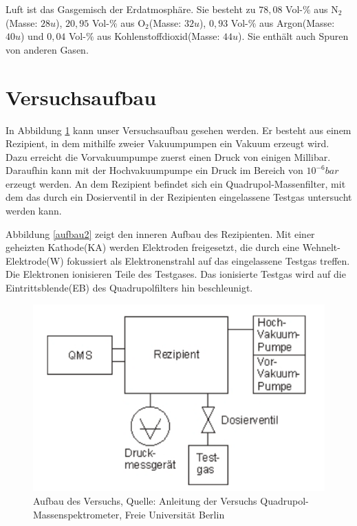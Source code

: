 \documentclass[10pt,a4paper]{article}
\begin{document}
Luft ist das Gasgemisch der Erdatmosphäre. Sie besteht zu $78,08$ Vol-$\%$ aus N$_2$(Masse: $28 u$), $20,95$ Vol-$\%$ aus O$_2$(Masse: $32u$), $0,93$ Vol-$\%$ aus Argon(Masse: $40u$) und $0,04$ Vol-$\%$ aus Kohlenstoffdioxid(Masse: $44u$). Sie enthält auch Spuren von anderen Gasen.



\section{Versuchsaufbau}

In Abbildung \ref{aufbau1} kann unser Versuchsaufbau gesehen werden. Er besteht aus einem Rezipient, in dem mithilfe zweier Vakuumpumpen ein Vakuum erzeugt wird. Dazu erreicht die Vorvakuumpumpe zuerst einen Druck von einigen Millibar. Daraufhin kann mit der Hochvakuumpumpe ein Druck im Bereich von $10^{-6} bar$ erzeugt werden. An dem Rezipient befindet sich ein Quadrupol-Massenfilter, mit dem das durch ein Dosierventil in der Rezipienten eingelassene Testgas untersucht werden kann.

Abbildung \ref{aufbau2} zeigt den inneren Aufbau des Rezipienten. Mit einer geheizten Kathode(KA) werden Elektroden freigesetzt, die durch eine Wehnelt-Elektrode(W) fokussiert als Elektronenstrahl auf das eingelassene Testgas treffen. Die Elektronen ionisieren Teile des Testgases. Das ionisierte Testgas wird auf die Eintrittsblende(EB) des Quadrupolfilters hin beschleunigt. 

\begin{figure}[h]
	\centering
	\includegraphics[scale = 0.8]{aufbau.png}
	\caption{Aufbau des Versuchs, Quelle: Anleitung der Versuchs Quadrupol-Massenspektrometer, Freie Universität Berlin}
	\label{aufbau1}
\end{figure}
\end{document}
